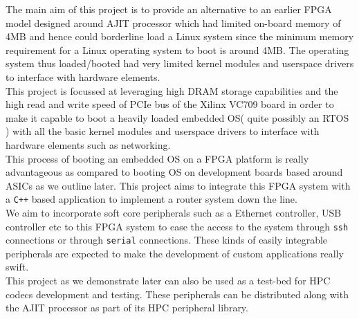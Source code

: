 The main aim of this project is to provide an alternative to an earlier FPGA model designed around AJIT processor which had limited
on-board memory of 4MB and hence could borderline load a Linux system since the minimum memory requirement for a Linux operating system to
boot is around 4MB. The operating system thus loaded/booted had very limited kernel modules and userspace drivers to interface with hardware
elements.\\

This project is focussed at leveraging high DRAM storage capabilities and the high read and write speed of PCIe bus of the Xilinx VC709
board in order to make it capable to boot a heavily loaded embedded OS( quite possibly an RTOS ) with all the basic kernel modules and
userspace drivers to interface with hardware elements such as networking.\\

This process of booting an embedded OS on a FPGA platform is really advantageous as compared to booting OS on development boards based
around ASICs as we outline later. This project aims to integrate this FPGA system with a \verb|C++| based application to implement
a router system down the line.\\

We aim to incorporate soft core peripherals such as a Ethernet controller, USB controller etc to this FPGA system to ease the access to the
system through \verb|ssh| connections or through \verb|serial| connections. These kinds of easily integrable peripherals are expected to
make the development of custom applications really swift.\\

This project as we demonstrate later can also be used as a test-bed for HPC codecs development and testing. These peripherals can be
distributed along with the AJIT processor as part of its HPC peripheral library.
